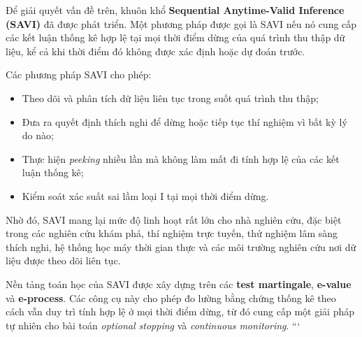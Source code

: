 Để giải quyết vấn đề trên, khuôn khổ
\textbf{Sequential Anytime-Valid Inference (SAVI)}
đã được phát triển. Một phương pháp được gọi là SAVI nếu nó cung cấp các kết luận thống kê hợp lệ tại mọi thời điểm dừng của quá trình thu thập dữ liệu, kể cả khi thời điểm đó không được xác định hoặc dự đoán trước.

Các phương pháp SAVI cho phép:

\begin{itemize}
    \item Theo dõi và phân tích dữ liệu liên tục trong suốt quá trình thu thập;
    
    \item Đưa ra quyết định thích nghi để dừng hoặc tiếp tục thí nghiệm vì bất kỳ lý do nào;
    
    \item Thực hiện \textit{peeking} nhiều lần mà không làm mất đi tính hợp lệ của các kết luận thống kê;
    
    \item Kiểm soát xác suất sai lầm loại I tại mọi thời điểm dừng.
\end{itemize}

Nhờ đó, SAVI mang lại mức độ linh hoạt rất lớn cho nhà nghiên cứu, đặc biệt trong các nghiên cứu khám phá, thí nghiệm trực tuyến, thử nghiệm lâm sàng thích nghi, hệ thống học máy thời gian thực và các môi trường nghiên cứu nơi dữ liệu được theo dõi liên tục.

Nền tảng toán học của SAVI được xây dựng trên các
\textbf{test martingale}, \textbf{e-value} và \textbf{e-process}.
Các công cụ này cho phép đo lường bằng chứng thống kê theo cách vẫn duy trì tính hợp lệ ở mọi thời điểm dừng, từ đó cung cấp một giải pháp tự nhiên cho bài toán \textit{optional stopping} và \textit{continuous monitoring}.
```
